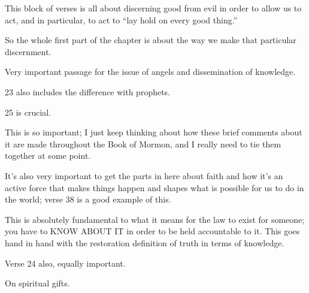 \begin{compactdesc}
				\begin{compactitem}
					\item This block of verses is all about discerning good from evil in order to allow us to act, and in particular, to act to ``lay hold on every good thing.''
					\item So the whole first part of the chapter is about the way we make that particular discernment.
				\end{compactitem}
			\item[{\hyperref[MORONI-7-22]{Moroni 7:22--39}}] \phantom{.}
				\begin{compactitem}
					\item Very important passage for the issue of angels and dissemination of knowledge.
					\item 23 also includes the difference with prophets.
					\item 25 is crucial.
					\item This is so important; I just keep thinking about how these brief comments about it are made throughout the Book of Mormon, and I really need to tie them together at some point.
					\item It's also very important to get the parts in here about faith and how it's an active force that makes things happen and shapes what is possible for us to do in the world; verse 38 is a good example of this.
				\end{compactitem}
			\item[{\hyperref[MORONI-7-44]{Moroni 7:44}}]
			\item[{\hyperref[MORONI-8-7]{Moroni 8:7--9}}]
			\item[{\hyperref[MORONI-8-22]{Moroni 8:22}}] \phantom{.}
				\begin{compactitem}
					\item This is absolutely fundamental to what it means for the law to exist for someone; you have to KNOW ABOUT IT in order to be held accountable to it. This goes hand in hand with the restoration definition of truth in terms of knowledge.
					\item Verse 24 also, equally important.
				\end{compactitem}
			\item[{\hyperref[MORONI-8-25]{Moroni 8:25--26}}]
			\item[{\hyperref[MORONI-8-28]{Moroni 8:28--29}}]
			\item[{\hyperref[MORONI-9-4]{Moroni 9:4}}]
			\item[{\hyperref[MORONI-9-20]{Moroni 9:20}}]
			\item[{\hyperref[MORONI-10-3]{Moroni 10:3--7}}]
			\item[{\hyperref[MORONI-10-8]{Moroni 10:8--19}}] \phantom{.}
				\begin{compactitem}
					\item On spiritual gifts.
				\end{compactitem}
		\end{compactdesc}
		
